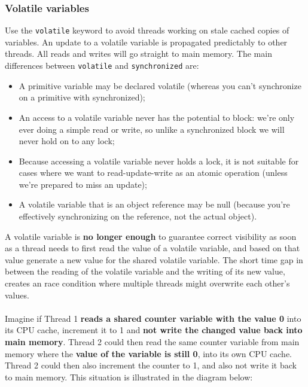 \documentclass{article}
\begin{document}
\subsubsection{Volatile variables}
Use the \lstinline{volatile} keyword to avoid threads working on stale cached copies of variables. An update to a volatile variable is propagated predictably to other threads. All reads and writes will go straight to main memory. The main differences between \lstinline{volatile} and \lstinline{synchronized} are:
\begin{itemize}
    \item A primitive variable may be declared volatile (whereas you can't synchronize on a primitive with synchronized);
    \item An access to a volatile variable never has the potential to block: we're only ever doing a simple read or write, so unlike a synchronized block we will never hold on to any lock;
    \item Because accessing a volatile variable never holds a lock, it is not suitable for cases where we want to read-update-write as an atomic operation (unless we're prepared to miss an update);
    \item A volatile variable that is an object reference may be null (because you're effectively synchronizing on the reference, not the actual object).
\end{itemize}
A volatile variable is \textbf{no longer enough} to guarantee correct visibility as soon as a thread needs to first read the value of a volatile variable, and based on that value generate a new value for the shared volatile variable. The short time gap in between the reading of the volatile variable and the writing of its new value, creates an race condition where multiple threads might overwrite each other's values.\\\\
Imagine if Thread 1 \textbf{reads a shared counter variable with the value 0} into its CPU cache, increment it to 1 and \textbf{not write the changed value back into main memory}. Thread 2 could then read the same counter variable from main memory where the \textbf{value of the variable is still 0}, into its own CPU cache. Thread 2 could then also increment the counter to 1, and also not write it back to main memory. This situation is illustrated in the diagram below:
\end{document}
